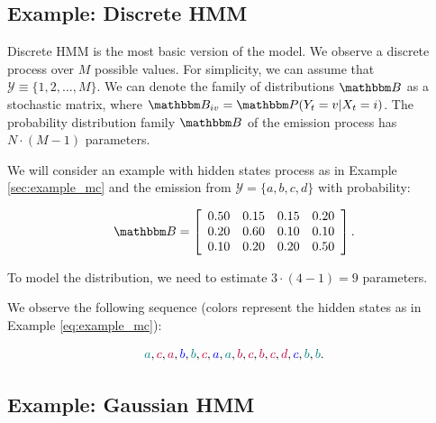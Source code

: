 \documentclass[shortabstract]{iithesis}
\begin{document}
\pagebreak

\subsection{Example: Discrete HMM} \label{sec:hmm_discrete}

Discrete HMM is the most basic version of the model. We observe a discrete process over $M$ possible values. For simplicity, we can assume that $\mathcal Y \equiv  \{1, 2, \ldots, M\}$.  We can denote the family of distributions $\mathbbm B$ as a stochastic matrix, where $\mathbbm B_{iv} = \mathbbm P(Y_t =  v | X_t = i)$. The probability distribution family $\mathbbm B$ of the emission process has $N \cdot (M - 1)$ parameters.

We will consider an example with hidden states process as in Example \ref{sec:example_mc} and the emission from $\mathcal Y = \{a, b, c, d \}$ with probability:

\begin{equation} \label{eq:ex_B}
    \mathbbm B = \left [\begin{array}{cccc}
        0.50 &  0.15 &  0.15 &  0.20\\
        0.20 &  0.60 &  0.10 &  0.10\\
        0.10 &  0.20 &  0.20 &  0.50\\
    \end{array}\right]\text{.}
\end{equation}

To model the distribution, we need to estimate $3 \cdot (4 - 1) = 9$ parameters.

We observe the following sequence (colors represent the hidden states as in Example \ref{eq:example_mc}):

\begin{equation} \label{eq:ex_gaussian}
    \textcolor{teal}{a}, \textcolor{purple}{c}, \textcolor{purple}{a}, \textcolor{blue}{b}, \textcolor{teal}{b}, \textcolor{purple}{c}, \textcolor{blue}{a}, \textcolor{teal}{a}, \textcolor{purple}{b}, \textcolor{purple}{c}, \textcolor{purple}{b}, \textcolor{purple}{c}, \textcolor{purple}{d}, \textcolor{blue}{c}, \textcolor{teal}{b}, \textcolor{teal}{b}\text{.}
\end{equation}

\subsection{Example: Gaussian HMM} \label{sec:hmm_gaussian}
\end{document}
